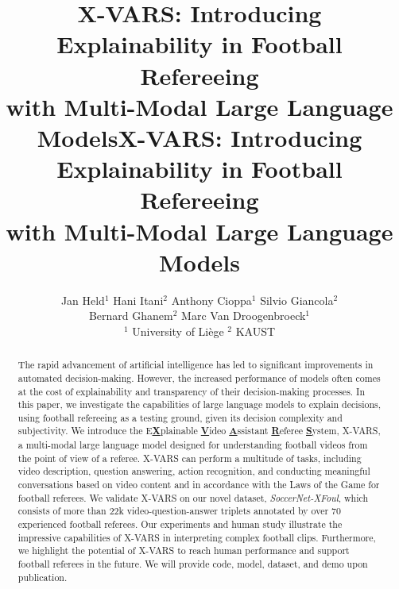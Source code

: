 \title{X-VARS: Introducing Explainability in Football Refereeing\\with Multi-Modal Large Language Models}



\title{X-VARS: Introducing Explainability in Football Refereeing\\with Multi-Modal Large Language Models}

\author{Jan Held$^{1}$%
\quad
Hani Itani$^{2}$  %
\quad
Anthony Cioppa$^{1}$  %
\quad
Silvio Giancola$^{2}$  %
\\
Bernard Ghanem$^{2}$  %
\quad
Marc Van Droogenbroeck$^{1}$  %
\\ $^1$ {\small University of Liège}
\quad $^2$ {\small KAUST}
}
\maketitle

\begin{abstract}
The rapid advancement of artificial intelligence has led to significant improvements in automated decision-making. However, the increased performance of models often comes at the cost of explainability and transparency of their decision-making processes. 
In this paper, we investigate the capabilities of large language models to explain decisions, using football refereeing as a testing ground, given its decision complexity and subjectivity.
We introduce the E\textbf{\underline{X}}plainable \textbf{\underline{V}}ideo \textbf{\underline{A}}ssistant \textbf{\underline{R}}eferee \textbf{\underline{S}}ystem, X-VARS, a multi-modal large language model designed for understanding football videos from the point of view of a referee. 
X-VARS can perform a multitude of tasks, including video description, question answering, action recognition, and conducting meaningful conversations based on video content and in accordance with the Laws of the Game for football referees.
We validate X-VARS on our novel dataset, \emph{SoccerNet-XFoul}, which consists of more than $22$k video-question-answer triplets annotated by over $70$ experienced football referees. 
Our experiments and human study illustrate the impressive capabilities of X-VARS in interpreting complex football clips. 
Furthermore, we highlight the potential of X-VARS to reach human performance and support football referees in the future.
We will provide code, model, dataset, and demo upon publication.

\end{abstract}

